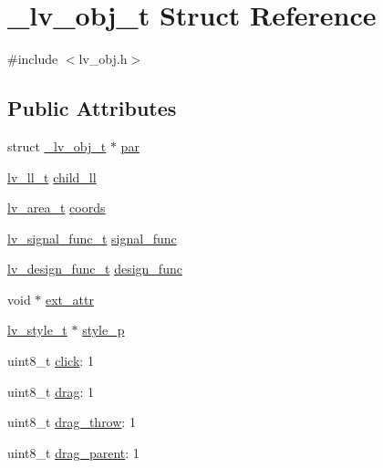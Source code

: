 \hypertarget{struct__lv__obj__t}{}\section{\+\_\+lv\+\_\+obj\+\_\+t Struct Reference}
\label{struct__lv__obj__t}


{\ttfamily \#include $<$lv\+\_\+obj.\+h$>$}

\subsection*{Public Attributes}
\begin{DoxyCompactItemize}
\item 
struct \mbox{\hyperlink{struct__lv__obj__t}{\+\_\+lv\+\_\+obj\+\_\+t}} $\ast$ \mbox{\hyperlink{struct__lv__obj__t_a554ebe722d56f60c92e36a45aee45e9a}{par}}
\item 
\mbox{\hyperlink{structlv__ll__t}{lv\+\_\+ll\+\_\+t}} \mbox{\hyperlink{struct__lv__obj__t_ad6b65cb2303495c9a2dec63def0fd185}{child\+\_\+ll}}
\item 
\mbox{\hyperlink{structlv__area__t}{lv\+\_\+area\+\_\+t}} \mbox{\hyperlink{struct__lv__obj__t_a5159a54e860e2efa245ccd12f1f26253}{coords}}
\item 
\mbox{\hyperlink{lv__obj_8h_abf8b1b808dc0bff6efafc876c3063b33}{lv\+\_\+signal\+\_\+func\+\_\+t}} \mbox{\hyperlink{struct__lv__obj__t_a67dfa50ddb472550147245d920ecf0e3}{signal\+\_\+func}}
\item 
\mbox{\hyperlink{lv__obj_8h_aa41044912c65f3e608f82c80761ebcfc}{lv\+\_\+design\+\_\+func\+\_\+t}} \mbox{\hyperlink{struct__lv__obj__t_a8d76f954e1e1b33617420c532ee1a8d7}{design\+\_\+func}}
\item 
void $\ast$ \mbox{\hyperlink{struct__lv__obj__t_a18b5c5372f83cb8640acf0c1d2beb7b9}{ext\+\_\+attr}}
\item 
\mbox{\hyperlink{structlv__style__t}{lv\+\_\+style\+\_\+t}} $\ast$ \mbox{\hyperlink{struct__lv__obj__t_aae8e88ef15ba4eedf3150eb5d1ae7021}{style\+\_\+p}}
\item 
uint8\+\_\+t \mbox{\hyperlink{struct__lv__obj__t_a5aff593ec2b2d1e1461a496569ce2e2c}{click}}\+: 1
\item 
uint8\+\_\+t \mbox{\hyperlink{struct__lv__obj__t_a37f3c5da535b993775a44f556e78aa9b}{drag}}\+: 1
\item 
uint8\+\_\+t \mbox{\hyperlink{struct__lv__obj__t_af06a95de66e183335be8481ce4504500}{drag\+\_\+throw}}\+: 1
\item 
uint8\+\_\+t \mbox{\hyperlink{struct__lv__obj__t_a57d344e11977aa356cc00fb2453c71d0}{drag\+\_\+parent}}\+: 1

\end{DoxyCompactItemize}
